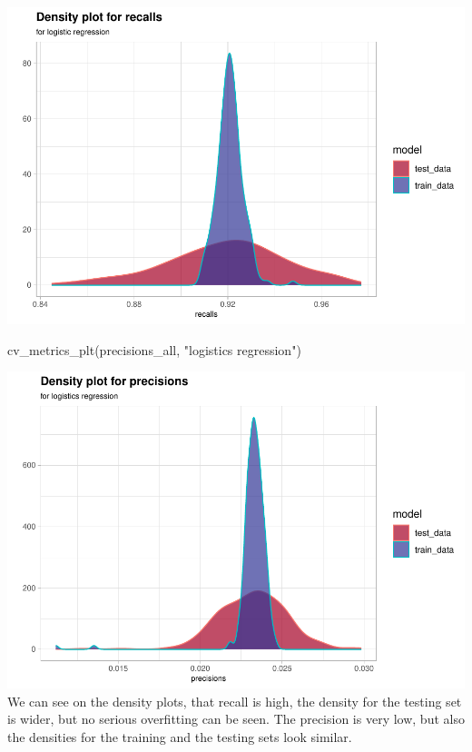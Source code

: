 \documentclass[
]{report}
\newenvironment{Shaded}{\begin{snugshade}}{\end{snugshade}}
\newcommand{\FunctionTok}[1]{\textcolor[rgb]{0.00,0.00,0.00}{#1}}
\newcommand{\NormalTok}[1]{#1}
\newcommand{\StringTok}[1]{\textcolor[rgb]{0.31,0.60,0.02}{#1}}
\begin{document}
\includegraphics{credit_card_fraud_detection_files/figure-latex/cv_metrics_plt-1.pdf}

\begin{Shaded}
\begin{Highlighting}[]
\FunctionTok{cv\_metrics\_plt}\NormalTok{(precisions\_all, }\StringTok{"logistics regression"}\NormalTok{)}
\end{Highlighting}
\end{Shaded}

\includegraphics{credit_card_fraud_detection_files/figure-latex/cv_metrics_plt-2.pdf}
We can see on the density plots, that recall is high, the density for
the testing set is wider, but no serious overfitting can be seen. The
precision is very low, but also the densities for the training and the
testing sets look similar.
\end{document}
